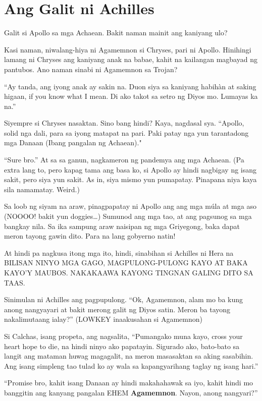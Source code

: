 \documentclass[12pt,letterpaper]{report}
\begin{document}
\chapter{Ang Galit ni Achilles}

Galit si Apollo sa mga Achaean. Bakit naman mainit ang kaniyang ulo?


Kasi naman, niwalang-hiya ni Agamemnon si Chryses, pari ni Apollo. Hinihingi lamang ni Chryses ang kaniyang anak na babae, kahit na kailangan magbayad ng pantubos. Ano naman sinabi ni Agamemnon sa Trojan?

``Ay tanda, ang iyong anak ay sakin na. Duon siya sa kaniyang habih\`{a}n at saking higaan, if you know what I mean. Di ako takot sa setro ng Diyos mo. Lumayas ka na.''

Siyempre si Chryses nasaktan. Sino bang hindi? Kaya, nagdasal sya. ``Apollo, solid nga dali, para sa iyong matapat na pari. Paki patay nga yun tarantadong mga Danaan (Ibang pangalan ng Achaean)."

``Sure bro.'' At sa sa ganun, nagkameron ng pandemya ang mga Achaean. (Pa extra lang to, pero kapag tama ang basa ko, si Apollo ay hindi nagbigay ng isang sakit, pero siya yun sakit. As in, siya mismo yun pumapatay. Pinapana niya kaya sila namamatay. Weird.)

Sa loob ng siyam na araw, pinagpapatay ni Apollo ang ang mga m\'{u}la at mga aso (NOOOO! bakit yun doggies\dots) Sumunod ang mga tao, at ang pagsunog sa mga bangkay nila. Sa ika sampung araw naisipan ng mga Griyegong, baka dapat meron tayong gawin dito. Para na lang gobyerno natin!

At hindi pa nagkusa itong mga ito, hindi, sinabihan si Achilles ni Hera na BILISAN NINYO MGA GAGO, MAGPULONG-PULONG KAYO AT BAKA KAYO'Y MAUBOS. NAKAKAAWA KAYONG TINGNAN GALING DITO SA TAAS.

Sinimulan ni Achilles ang pagpupulong. ``Ok, Agamemnon, alam mo ba kung anong nangyayari at bakit merong galit ng Diyos satin. Meron ba tayong nakalimutaang ialay?'' (LOWKEY inaakusahan si Agamemnon)

Si Calchas, isang propeta, ang nagsalita, ``Pumangako muna kayo, cross your heart hope to die, na hindi ninyo ako papatayin. Sigurado ako, bato-bato sa langit ang mataman huwag magagalit, na meron masasaktan sa aking sasabihin. Ang isang simpleng tao tulad ko ay wala sa kapangyarihang taglay ng isang hari.''

``Promise bro, kahit isang Danaan ay hindi makahahawak sa iyo, kahit hindi mo banggitin ang kanyang pangalan EHEM \textbf{Agamemnon}. Nayon, anong nangyari?''
\end{document}
